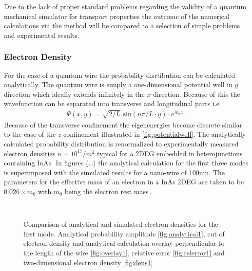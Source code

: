 Due to the lack of proper standard problems regarding the validity of a quantum mechanical simulator for transport properties the outcome of the numerical calculations via the \gfnc{} method will be compared to a selection of simple problems and experimental results.\par
\subsubsection{Electron Density}
For the case of a quantum wire the probability disrtibution can be calculated analytically. The quantum wire is simply a one-dimensional potential well in $y$ direction which ideally extends infinitely in the $x$ direction.
Because of this the wavefunction can be separated into transverse and longitudinal parts i.e
\begin{align}
\Psi(x,y) = \sqrt{2/L}\text{ sin}(n\pi/L \cdot y) \cdot e^{ik_xx}\,.
\end{align}
Because of the transverse confinement the eigenenergies become discrete similar to the case of the $z$ confinement illustrated in \cref{fig:potentialwell}.
The analytically calculated probability distribution is renormalized to experimentally measured electron densities $n \sim 10^{17}/m^2$ typical for a 2DEG embedded in heterojunctions containing InAs\,\cite{gelfand2006}\,\cite{JJAP.26.L59}
In figures (\dots ) the analytical calculation for the first three modes is superimposed with the simulated results for a nano-wire of 100nm. 
The parameters for the effective mass of an electron in a InAs 2DEG are taken to be $0.026\times m_0$ with $m_0$ being the electron rest mass\,\cite{PhysRev.105.460}.\par
\begin{figure}[h!]
  \begin{center}
 \qquad
    \\
    \qquad
    \caption{Comparison of analytical and simulated electron densities for the first mode. Analytical probability amplitude \ref{fig:analytical1}, cut of electron density and analytical calculation overlay perpendicular to the length of the wire \ref{fig:overlay1}, relative error \ref{fig:relerror1} and two-dimensional electron density \ref{fig:dens1}}\label{fig:mode1}
  \end{center}
\end{figure}
